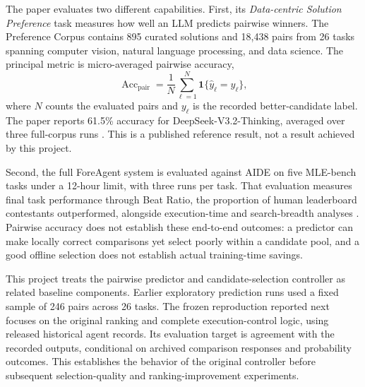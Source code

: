 \documentclass{article}
\begin{document}
The paper evaluates two different capabilities. First, its \emph{Data-centric Solution Preference} task measures how well an LLM predicts pairwise winners. The Preference Corpus contains 895 curated solutions and 18,438 pairs from 26 tasks spanning computer vision, natural language processing, and data science. The principal metric is micro-averaged pairwise accuracy,
\begin{equation}
  \operatorname{Acc}_{\mathrm{pair}}
  =\frac{1}{N}\sum_{\ell=1}^{N}
    \mathbf{1}\{\widehat{y}_{\ell}=y_{\ell}\},
  \label{eq:accuracy}
\end{equation}
where $N$ counts the evaluated pairs and $y_\ell$ is the recorded better-candidate label. The paper reports 61.5\% accuracy for DeepSeek-V3.2-Thinking, averaged over three full-corpus runs \citep[Table~2]{zheng2026predict}. This is a published reference result, not a result achieved by this project.

Second, the full ForeAgent system is evaluated against AIDE on five MLE-bench tasks under a 12-hour limit, with three runs per task. That evaluation measures final task performance through Beat Ratio, the proportion of human leaderboard contestants outperformed, alongside execution-time and search-breadth analyses \citep[Sections~6.3--6.4]{zheng2026predict}. Pairwise accuracy does not establish these end-to-end outcomes: a predictor can make locally correct comparisons yet select poorly within a candidate pool, and a good offline selection does not establish actual training-time savings.

This project treats the pairwise predictor and candidate-selection controller as related baseline components. Earlier exploratory prediction runs used a fixed sample of 246 pairs across 26 tasks. The frozen reproduction reported next focuses on the original ranking and complete execution-control logic, using released historical agent records. Its evaluation target is agreement with the recorded outputs, conditional on archived comparison responses and probability outcomes. This establishes the behavior of the original controller before subsequent selection-quality and ranking-improvement experiments.


\end{document}
